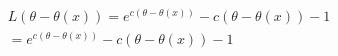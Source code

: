 \begin{align*}
  L(\theta-\theta(x)) = e^{c(\theta-\theta(x))} - c(\theta-\theta(x)) - 1\\
  = e^{c(\theta-\theta(x))} - c(\theta-\theta(x)) - 1\\
\end{align*}

